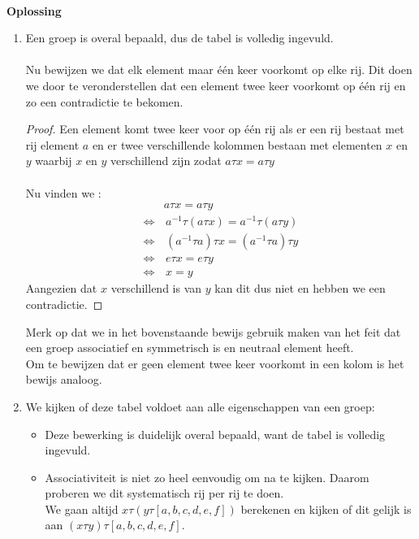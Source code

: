 \documentclass[11pt,a4paper,titlepage]{article}
\begin{document}
 \noindent \\ \textbf{Oplossing} \\ 
\begin{enumerate}[label=(\alph*)]
	\item 
			Een groep is overal bepaald, dus de tabel is volledig ingevuld. \\ \\
			Nu bewijzen we dat elk element maar één keer voorkomt op elke rij. Dit doen we door te veronderstellen dat een element twee keer voorkomt op één rij en zo een contradictie te bekomen.
				\begin{proof}
					Een element komt twee keer voor op één rij als er een rij bestaat met rij element $a$ en er twee verschillende kolommen bestaan met elementen $x$ en $y$ waarbij $x$ en $y$ verschillend zijn zodat $a\tau x = a\tau y $\\ \\
					Nu vinden we :
						\begin{align*} 
							& a\tau x = a\tau y  \\
							\Leftrightarrow  &\, a^{-1} \tau (a\tau x) = a^{-1} \tau (a\tau y)\\
							\Leftrightarrow  &\, (a^{-1} \tau a)\tau x = (a^{-1} \tau a)\tau y \\
							\Leftrightarrow  &\, e\tau x = e\tau y \\
							\Leftrightarrow  &\, x  = y
						\end{align*}
					Aangezien dat $x$ verschillend is van $y$ kan dit dus niet en hebben we een contradictie.
				\end{proof}
				Merk op dat we in het bovenstaande bewijs gebruik maken van het feit dat een groep associatief en symmetrisch is en neutraal element heeft. \\
				Om te bewijzen dat er geen element twee keer voorkomt in een kolom is het bewijs analoog.
	\item We kijken of deze tabel voldoet aan alle eigenschappen van een groep:
		\begin{itemize}
			\item Deze bewerking is duidelijk overal bepaald, want de tabel is volledig ingevuld.
			\item Associativiteit is niet zo heel eenvoudig om na te kijken. Daarom proberen we dit systematisch rij per rij te doen. \\
	We gaan altijd $ x \tau (y \tau [a, b, c,d,e,f])$ berekenen en kijken of dit gelijk is aan $(x \tau y) \tau  [a, b, c,d,e,f]$.\\

\end{itemize}
\end{enumerate}
\end{document}
